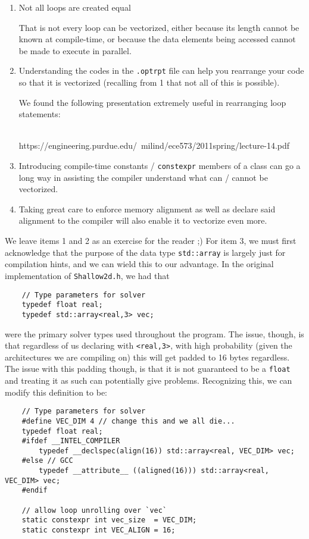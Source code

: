\begin{enumerate}[1.]
    \item Not all loops are created equal

    That is not every loop can be vectorized, either because its length cannot be known at compile-time, or because the data elements being accessed cannot be made to execute in parallel.

    \item Understanding the codes in the \texttt{.optrpt} file can help you rearrange your code so that it is vectorized (recalling from 1 that not all of this is possible).

    We found the following presentation extremely useful in rearranging loop statements:\\\\ \centerline{https://engineering.purdue.edu/~milind/ece573/2011spring/lecture-14.pdf}

    \item Introducing compile-time constants / \texttt{constexpr} members of a class can go a long way in assisting the compiler understand what can / cannot be vectorized.

    \item Taking great care to enforce memory alignment as well as declare said alignment to the compiler will also enable it to vectorize even more.
\end{enumerate}

We leave items 1 and 2 as an exercise for the reader ;)  For item 3, we must first acknowledge that the purpose of the data type \texttt{std::array} is largely just for compilation hints, and we can wield this to our advantage.  In the original implementation of \texttt{Shallow2d.h}, we had that

{\tiny
\begin{lstlisting}
    // Type parameters for solver
    typedef float real;
    typedef std::array<real,3> vec;
\end{lstlisting}
}

were the primary solver types used throughout the program.  The issue, though, is that regardless of us declaring with \texttt{<real,3>}, with high probability (given the architectures we are compiling on) this will get padded to 16 bytes regardless.  The issue with this padding though, is that it is not guaranteed to be a \texttt{float} and treating it as such can potentially give problems.  Recognizing this, we can modify this definition to be:

{\tiny
\begin{lstlisting}
    // Type parameters for solver
    #define VEC_DIM 4 // change this and we all die...
    typedef float real;
    #ifdef __INTEL_COMPILER
        typedef __declspec(align(16)) std::array<real, VEC_DIM> vec;
    #else // GCC
        typedef __attribute__ ((aligned(16))) std::array<real, VEC_DIM> vec;
    #endif

    // allow loop unrolling over `vec`
    static constexpr int vec_size  = VEC_DIM;
    static constexpr int VEC_ALIGN = 16;
\end{lstlisting}
}


